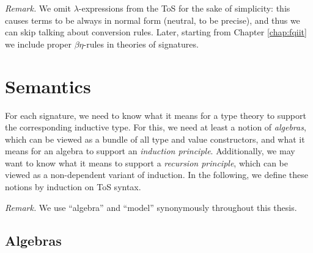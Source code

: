 \documentclass[12pt,a4paper,twoside,openany]{book}
\theoremstyle{remark}
\theoremstyle{definition}
\theoremstyle{theorem}
\begin{document}
\emph{Remark.} We omit $\lambda$-expressions from the ToS for the sake of
simplicity: this causes terms to be always in normal form (neutral, to be
precise), and thus we can skip talking about conversion rules. Later, starting
from Chapter \ref{chap:fqiit} we include proper $\beta\eta$-rules in theories of
signatures.

\section{Semantics}
\label{sec:simple-semantics}

For each signature, we need to know what it means for a type theory to support
the corresponding inductive type. For this, we need at least a notion of
\emph{algebras}, which can be viewed as a bundle of all type and
value constructors, and what it means for an algebra to support an
\emph{induction principle}.  Additionally, we may want to know what it means to
support a \emph{recursion principle}, which can be viewed as a non-dependent
variant of induction. In the following, we define these notions by induction on
ToS syntax.

\emph{Remark.} We use ``algebra'' and ``model'' synonymously throughout
this thesis.

\subsection{Algebras}
\end{document}
